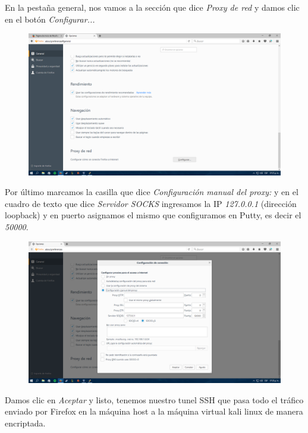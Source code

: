 \documentclass{article}
\begin{document}
En la pestaña general, nos vamos a la secci\'on que dice \emph{Proxy de red} y damos clic en el bot\'on \emph{Configurar...}

\begin{figure}[H]
\centering
\includegraphics[width=1\textwidth]{12-CONFIGURACIONPROXY}
\end{figure}

Por \'ultimo marcamos la casilla que dice \emph{Configuraci\'on manual del proxy:} y en el cuadro de texto que dice \emph{Servidor SOCKS} ingresamos la IP \emph{127.0.0.1} (direcci\'on loopback) y en puerto asignamos el mismo que configuramos en Putty, es decir el \emph{50000}. 

\begin{figure}[H]
\centering
\includegraphics[width=1\textwidth]{13-CONFIGURACIONSOCKS}
\end{figure}

Damos clic en \emph{Aceptar} y listo, tenemos nuestro tunel SSH que pasa todo el tr\'afico enviado por Firefox en la m\'aquina host a la m\'aquina virtual kali linux de manera encriptada.
\end{document}
